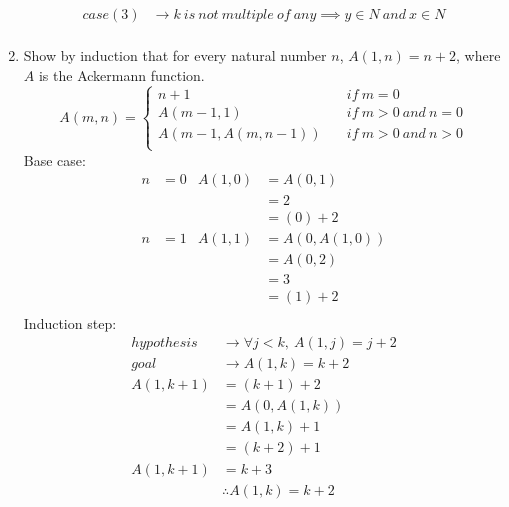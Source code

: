 \documentclass{article}
\begin{document}
\begin{enumerate}
\begin{align*}
        case (3) &\rightarrow k\ is\ not\ multiple\ of\ any \implies y \in N\ and\ x \in N\\
    \end{align*}
    \item Show by induction that for every natural number $n$, $A(1,n) = n+2$, where $A$ is the Ackermann function.
    \[   
    A(m,n) = 
    \begin{cases}
        n + 1 &\quad if\ m=0\\
        A(m-1, 1) &\quad if\ m >0\ and\ n=0\\
        A(m-1, A(m, n - 1)) &\quad if\ m >0\ and\ n >0\\
    \end{cases}
    \]
    Base case:
    \begin{align*}
        n &= 0 & A(1, 0) &= A(0, 1)\\
        & & &=2\\
        & & &=(0) +2\\
        n &= 1 & A(1, 1) &= A(0, A(1, 0))\\
        & & &=A(0, 2)\\
        & & &=3\\
        & & &=(1) +2\\
    \end{align*}
    Induction step:
    \begin{align*}
        hypothesis &\rightarrow \forall j < k,\ A(1,j) = j + 2\\
        goal &\rightarrow A(1,k) = k + 2\\
        A(1, k + 1) &= (k + 1) + 2\\
        &= A(0, A(1, k))\\
        &= A(1, k) +1\\
        &= (k + 2) +1\\
        A(1, k + 1) &= k + 3\\
        &\therefore A(1,k) = k + 2
    \end{align*}
\end{enumerate}
\end{document}
